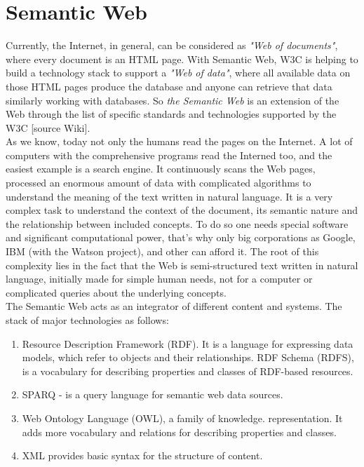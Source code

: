 \section{Semantic Web}
Currently, the Internet, in general, can be considered as \textit{"Web of documents"}, where every document is an HTML page. With Semantic Web, W3C is helping to build a technology stack to support a \textit{"Web of data"}, where all available data on those HTML pages produce the database and anyone can retrieve that data similarly working with databases. So \textit{the Semantic Web} is an extension of the Web through the list of specific standards and technologies supported by the W3C [source Wiki].  \\

As we know, today not only the humans read the pages on the Internet. A lot of computers with the comprehensive programs read the Interned too, and the easiest example is a search engine. It continuously scans the Web pages, processed an enormous amount of data with complicated algorithms to understand the meaning of the text written in natural language. It is a very complex task to understand the context of the document, its semantic nature and the relationship between included concepts. To do so one needs special software and significant computational power, that's why only big corporations as Google, IBM (with the Watson project), and other can afford it. The root of this complexity lies in the fact that the Web is semi-structured text written in natural language, initially made for simple human needs, not for a computer or complicated queries about the underlying concepts.\\ 

The Semantic Web acts as an integrator of different content and systems. The stack of major technologies as follows: 

\begin{enumerate}
    \item Resource Description Framework (RDF). It is a language for expressing data models, which refer to objects and their relationships. 
    \itme RDF Schema (RDFS), is a vocabulary for describing properties and classes of RDF-based resources.
    \item SPARQ - is a query language for semantic web data sources.
    \item Web Ontology Language (OWL), a family of knowledge. representation. It adds more vocabulary and relations for describing properties and classes.
    \item XML provides basic syntax for the structure of content.
\end{enumerate}

